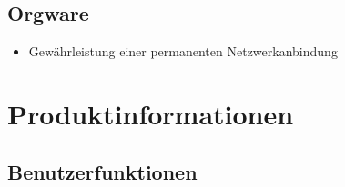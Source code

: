 \documentclass[a4paper,oneside,10pt]{scrreprt}
\begin{document}
\section{Orgware}

\begin{itemize}
\item Gewährleistung einer permanenten Netzwerkanbindung
\end{itemize}

\chapter{Produktinformationen}

\section{Benutzerfunktionen}
\end{document}
